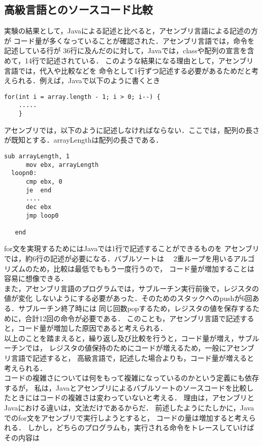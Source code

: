 \documentclass[a4j]{jarticle}
\begin{document}
\subsection{高級言語とのソースコード比較}
実験の結果として，Javaによる記述と比べると，アセンブリ言語による記述の方が
コード量が多くなっていることが確認された．アセンブリ言語では，命令を記述している行が
36行に及んだのに対して，Javaでは，classや配列の宣言を含めて，14行で記述されている．
このような結果になる理由として，アセンブリ言語では，代入や比較などを
命令として1行ずつ記述する必要があるためだと考えられる．例えば，Javaで以下のように書くとき
\begin{lstlisting}[caption=Javaでの繰り返し文]
  for(int i = array.length - 1; i > 0; i--) {
    .....
    }
\end{lstlisting}
アセンブリでは，以下のように記述しなければならない．ここでは，配列の長さが既知とする．arrayLengthは配列の長さである．
\begin{lstlisting}[caption=アセンブリでの繰り返し文]
      sub arrayLength, 1    
      mov ebx, arrayLength
  loopn0:
      cmp ebx, 0
      je  end
      ....
      dec ebx
      jmp loop0

   end
\end{lstlisting}
\indent for文を実現するためにはJavaでは1行で記述することができるものを
アセンブリでは，約6行の記述が必要になる．バブルソートは　
2重ループを用いるアルゴリズムのため，比較は最低でももう一度行うので，
コード量が増加することは容易に想像できる．\\
\indent また，アセンブリ言語のプログラムでは，サブルーチン実行前後で，レジスタの値が変化
しないようにする必要があった．そのためのスタックへのpushが6回ある．サブルーチン終了時には
同じ回数popするため，レジスタの値を保存するために，合計12回の命令が必要である．
このことも，アセンブリ言語で記述すると，コード量が増加した原因であると考えられる．\\
 \indent 以上のことを踏まえると，繰り返し及び比較を行うと，コード量が増え，サブルーチンでは，
レジスタの値保持のためにコードが増えるため，一般にアセンブリ言語で記述すると，
高級言語で，記述した場合よりも，コード量が増えると考えられる．\\
\indent
 コードの複雑さについては何をもって複雑になっているのかという定義にも依存するが，
私は，Javaとアセンブリによるバブルソートのソースコードを比較したときにはコードの複雑さは変わっていないと考える．
理由は，アセンブリとJavaにおける違いは，文法だけであるからだ．
前述したようにたしかに，Javaでのfor文をアセンブリで実行しようとすると，
コードの量は増加すると考えられる．
しかし，どちらのプログラムも，実行される命令をトレースしていけばその内容は
\end{document}

